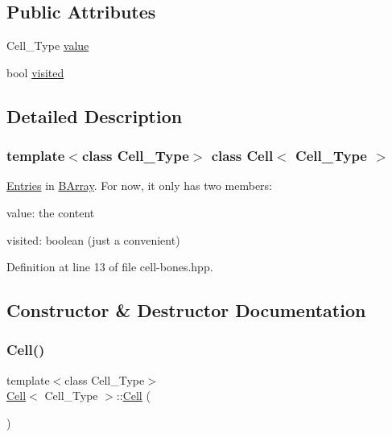 \subsection*{Public Attributes}
\begin{DoxyCompactItemize}
\item 
Cell\+\_\+\+Type \hyperlink{class_cell_a5df1609bc0705830ec4dc6e177ddc955}{value}
\item 
bool \hyperlink{class_cell_a1f539a05953fa05d723c32e718f0eeb3}{visited}
\end{DoxyCompactItemize}


\subsection{Detailed Description}
\subsubsection*{template$<$class Cell\+\_\+\+Type$>$\newline
class Cell$<$ Cell\+\_\+\+Type $>$}

\hyperlink{class_entries}{Entries} in \hyperlink{class_b_array}{B\+Array}. For now, it only has two members\+: 


\begin{DoxyItemize}
\item value\+: the content
\item visited\+: boolean (just a convenient) 
\end{DoxyItemize}

Definition at line 13 of file cell-\/bones.\+hpp.



\subsection{Constructor \& Destructor Documentation}
\mbox{\label{class_cell_a402912c21a4c87659c0576a4bfa3c48f}} 
\subsubsection{\texorpdfstring{Cell()}{Cell()}\hspace{0.1cm}{\footnotesize\ttfamily [1/12]}}
{\footnotesize\ttfamily template$<$class Cell\+\_\+\+Type$>$ \\
\hyperlink{class_cell}{Cell}$<$ Cell\+\_\+\+Type $>$\+::\hyperlink{class_cell}{Cell} (\begin{DoxyParamCaption}{ }\end{DoxyParamCaption})}

